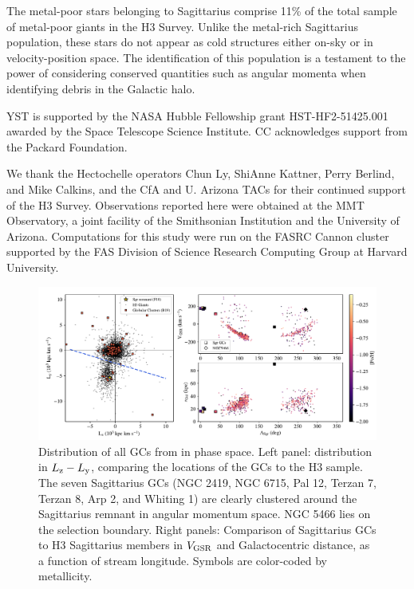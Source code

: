 \documentclass[twocolumn,tighten,twocolappendix]{aastex63}
\newcommand{\sgr}{Sagittarius}
\newcommand{\Ly}{L_{\rm y}}
\newcommand{\Lz}{L_{\rm z}}
\newcommand{\Vgsr}{V_{\rm GSR}}
\begin{document}
\begin{CJK*}{UTF8}{gbsn}
The metal-poor stars belonging to \sgr{} comprise 11\% of the total sample of metal-poor giants in the H3 Survey.  Unlike the metal-rich \sgr{} population, these stars do not appear as cold structures either on-sky or in velocity-position space.  The identification of this population is a testament to the power of considering conserved quantities such as angular momenta when identifying debris in the Galactic halo.

\acknowledgments

YST is supported by the NASA Hubble Fellowship grant HST-HF2-51425.001 awarded by the Space Telescope Science Institute.  CC acknowledges support from the Packard Foundation.

We thank the Hectochelle operators Chun Ly, ShiAnne Kattner, Perry Berlind, and Mike Calkins, and the CfA and U. Arizona TACs for their continued support of the H3 Survey. Observations reported here were obtained at the MMT Observatory, a joint facility of the Smithsonian Institution and the University of Arizona. Computations for this study were run on the FASRC Cannon cluster supported by the FAS Division of Science Research Computing Group at Harvard University.


\begin{appendix}


\begin{figure}[t!]
\includegraphics[width=\textwidth]{sgr_globulars.pdf}
\caption{Distribution of all GCs from \citet{Baumgardt19} in phase space.  Left panel: distribution in $\Lz-\Ly$, comparing the locations of the GCs to the H3 sample.  The seven \sgr{} GCs (NGC 2419, NGC 6715, Pal 12, Terzan 7, Terzan 8, Arp 2, and Whiting 1) are clearly clustered around the \sgr{} remnant \citep[star symbol;][]{Fritz18} in angular momentum space.  NGC 5466 lies on the selection boundary.  Right panels: Comparison of \sgr{} GCs to H3 \sgr{} members in $\Vgsr$ and Galactocentric distance, as a function of stream longitude.  Symbols are color-coded by metallicity.
\label{fig:globulars}}
\end{figure}


\end{appendix}
\end{CJK*}
\end{document}
